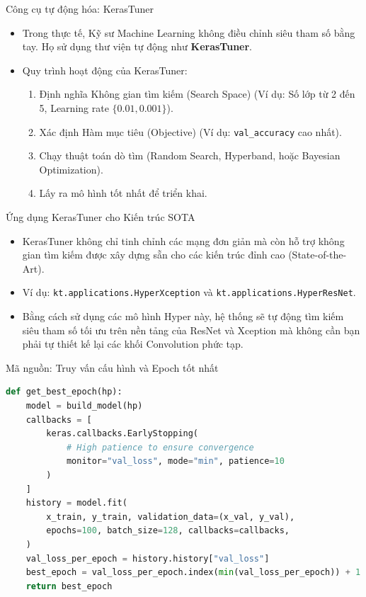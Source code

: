 \documentclass[aspectratio=169]{beamer}
\begin{document}
\begin{frame}{Công cụ tự động hóa: KerasTuner}
    \begin{itemize}
        \item Trong thực tế, Kỹ sư Machine Learning không điều chỉnh siêu tham số bằng tay. Họ sử dụng thư viện tự động như \textbf{KerasTuner}.
        \item Quy trình hoạt động của KerasTuner:
        \begin{enumerate}
            \item Định nghĩa Không gian tìm kiếm (Search Space) (Ví dụ: Số lớp từ 2 đến 5, Learning rate $\{0.01, 0.001\}$).
            \item Xác định Hàm mục tiêu (Objective) (Ví dụ: \texttt{val\_accuracy} cao nhất).
            \item Chạy thuật toán dò tìm (Random Search, Hyperband, hoặc Bayesian Optimization).
            \item Lấy ra mô hình tốt nhất để triển khai.
        \end{enumerate}
    \end{itemize}
\end{frame}

\begin{frame}{Ứng dụng KerasTuner cho Kiến trúc SOTA}
    \begin{itemize}
        \item KerasTuner không chỉ tinh chỉnh các mạng đơn giản mà còn hỗ trợ không gian tìm kiếm được xây dựng sẵn cho các kiến trúc đỉnh cao (State-of-the-Art).
        \item Ví dụ: \texttt{kt.applications.HyperXception} và \texttt{kt.applications.HyperResNet}.
        \item Bằng cách sử dụng các mô hình Hyper này, hệ thống sẽ tự động tìm kiếm siêu tham số tối ưu trên nền tảng của ResNet và Xception mà không cần bạn phải tự thiết kế lại các khối Convolution phức tạp.
    \end{itemize}
\end{frame}

\begin{frame}[fragile]{Mã nguồn: Truy vấn cấu hình và Epoch tốt nhất}
\begin{lstlisting}[language=Python]
def get_best_epoch(hp):
    model = build_model(hp)
    callbacks = [
        keras.callbacks.EarlyStopping(
            # High patience to ensure convergence
            monitor="val_loss", mode="min", patience=10
        )
    ]
    history = model.fit(
        x_train, y_train, validation_data=(x_val, y_val),
        epochs=100, batch_size=128, callbacks=callbacks,
    )
    val_loss_per_epoch = history.history["val_loss"]
    best_epoch = val_loss_per_epoch.index(min(val_loss_per_epoch)) + 1
    return best_epoch
\end{lstlisting}
\end{frame}
\end{document}
